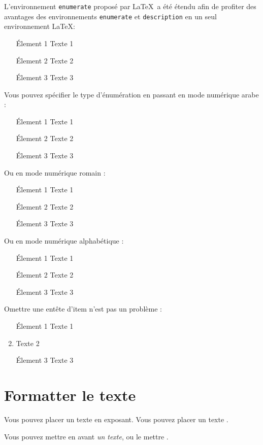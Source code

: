\documentclass[french]{spimutbmphdthesis}
\begin{document}
L'environnement \texttt{enumerate} proposé par \LaTeX\ a été étendu afin de profiter des avantages des environnements \texttt{enumerate} et \texttt{description} en un seul environnement \LaTeX:
\begin{enumerate}
\item[\'Element 1] Texte 1
\item[\'Element 2] Texte 2
\item[\'Element 3] Texte 3
\end{enumerate}

Vous pouvez spécifier le type d'énumération en passant en mode numérique arabe :
\begin{enumerate}[1]
\item[\'Element 1] Texte 1
\item[\'Element 2] Texte 2
\item[\'Element 3] Texte 3
\end{enumerate}

Ou en mode numérique romain :
\begin{enumerate}[i]
\item[\'Element 1] Texte 1
\item[\'Element 2] Texte 2
\item[\'Element 3] Texte 3
\end{enumerate}

Ou en mode numérique alphabétique :
\begin{enumerate}[a]
\item[\'Element 1] Texte 1
\item[\'Element 2] Texte 2
\item[\'Element 3] Texte 3
\end{enumerate}

Omettre une entête d'item n'est pas un problème :
\begin{enumerate}
\item[\'Element 1] Texte 1
\item Texte 2
\item[\'Element 3] Texte 3
\end{enumerate}

\section{Formatter le texte}

Vous pouvez placer un texte \textup{en exposant}. Vous pouvez placer un texte .

Vous pouvez mettre en avant \emph{un texte}, ou le mettre .
\end{document}
